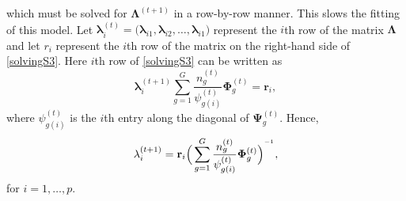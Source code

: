 \documentclass[12pt]{article}
\newcommand{\inv}{^{\raisebox{.2ex}{$\scriptscriptstyle-1$}}}
\begin{document}
which must be solved for $\mathbf{\Lambda}^{(t+1)}$ in a row-by-row manner. This slows the fitting of this model. Let $\mathbf{\lambda}_i^{(t)} = \big( \mathbf{\lambda}_{i1}, \mathbf{\lambda}_{i2}, \ldots, \mathbf{\lambda}_{i1} \big)$ represent the $i$th row of the matrix $\mathbf{\Lambda}$ and let $r_i$ represent the $i$th row of the matrix on the right-hand side of \eqref{solvingS3}. Here $i$th row of \eqref{solvingS3} can be written as 
\begin{equation*}
\mathbf{\lambda}_i^{(t+1)} \sum_{g=1}^G \frac{n_g^{(t)} }{\psi^{(t)}_{g(i)}} \mathbf{\Phi}_g^{(t)} = \mathbf{r}_i,
\end{equation*}
where $\psi^{(t)}_{g(i)}$ is the $i$th entry along the diagonal of $\mathbf{\Psi}_g^{(t)} $. Hence, 
\begin{equation*}
\mathbf{\lambda}_i^{(t+1)}  = \mathbf{r}_i \Big( \sum_{g=1}^G \frac{n_g^{(t)}}{\psi^{(t)}_{g(i)}} \mathbf{\Phi}_g^{(t)} \Big)^{\inv},
\end{equation*}
for $i = 1, \ldots, p$. \\
\end{document}
